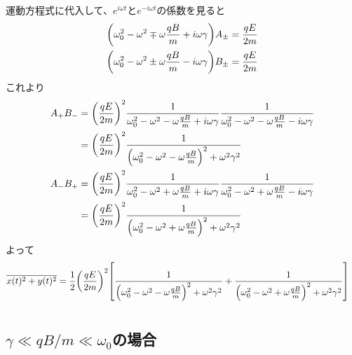 \documentclass[../ap_2011.tex]{subfiles}
\begin{document}
運動方程式に代入して、\(e^{i\omega t}\)と\(e^{-i\omega t}\)の係数を見ると
\begin{equation}\begin{aligned}[b]
    \qty(\omega_0^2-\omega^2\mp\omega\frac{qB}{m}+i\omega \gamma)A_\pm &= \frac{qE}{2m}\\
    \qty(\omega_0^2-\omega^2\pm\omega\frac{qB}{m}-i\omega \gamma)B_\pm &= \frac{qE}{2m}
\end{aligned}\end{equation}
これより
\begin{equation}\begin{aligned}[b]
    A_+B_-
    &= \qty(\frac{qE}{2m})^2\frac{1}{\omega_0^2-\omega^2-\omega\frac{qB}{m}+i\omega\gamma}\frac{1}{\omega_0^2-\omega^2-\omega\frac{qB}{m}-i\omega\gamma}\\
    &= \qty(\frac{qE}{2m})^2\frac{1}{\qty(\omega_0^2-\omega^2-\omega\frac{qB}{m})^2+\omega^2\gamma^2}\\
    A_-B_+
    &= \qty(\frac{qE}{2m})^2\frac{1}{\omega_0^2-\omega^2+\omega\frac{qB}{m}+i\omega\gamma}\frac{1}{\omega_0^2-\omega^2+\omega\frac{qB}{m}-i\omega\gamma}\\
    &= \qty(\frac{qE}{2m})^2\frac{1}{\qty(\omega_0^2-\omega^2+\omega\frac{qB}{m})^2+\omega^2\gamma^2}
\end{aligned}\end{equation}
よって
\begin{equation}\begin{aligned}[b]
    \overline{x(t)^2+y(t)^2}
    &=\frac{1}{2}\qty(\frac{qE}{2m})^2\qty[\frac{1}{\qty(\omega_0^2-\omega^2-\omega\frac{qB}{m})^2+\omega^2\gamma^2}
    +\frac{1}{\qty(\omega_0^2-\omega^2+\omega\frac{qB}{m})^2+\omega^2\gamma^2}]
\end{aligned}\end{equation}

\section{}
\subsection*{\(\gamma\ll qB/m \ll \omega_0\)の場合}
\end{document}
